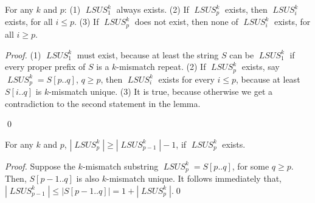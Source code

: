 \documentclass[11pt]{llncs}
\newcommand{\remove}[1]{}
\DeclareMathOperator{\lsus}{\mathit{LSUS}}
\begin{document}
\begin{lemma}
\label{lem:exist}
For any $k$ and $p$: (1) $\lsus_1^k$ always exists. (2) If
$\lsus_p^k$ exists, then $\lsus_i^k$ exists, for all $i\leq p$.
 (3) If $\lsus_p^k$ does not exist, then none of $\lsus^k_{i}$ exists,
for all  $i\geq p$.
\end{lemma}

\begin{proof}
(1) $\lsus_1^k$ must exist, because at least the string $S$ can be
$\lsus_1^k$ if every proper prefix of $S$ is a $k$-mismatch repeat. 
(2) If $\lsus_p^k$ exists, say $\lsus_p^k = S[p .. q]$, $q\geq p$,
then 
$\lsus_i^k$ exists for every $i\leq p$, because at least $S[i .. q]$ is
$k$-mismatch unique.
(3) It is true, because otherwise we get a contradiction to the second
statement in the lemma. 
\remove{
If $\lsus_p^k$ does not exist, it means $S[p .. n]$ is a
$k$-mismatch repeat. It follows that
every suffix $S[i.. n]$ of $S[p .. n]$, $i\geq p$, is
also a $k$-mismatch repeat, i.e., none of 
$\lsus_i^k$ exists, for all $i\geq p$.}
\qed
\end{proof}


\begin{lemma}
\label{lem:lsus2}
For any $k$ and $p$, $|\lsus_p^k| \geq |\lsus_{p-1}^k| - 1$, if
$\lsus_p^k$ exists. 
\end{lemma}


\begin{proof}
\remove{
  Since $\lsus_p^k$ exists, so does $\lsus_{p-1}^k$
  (Lemma~\ref{lem:exist}).  
}
  Suppose the $k$-mismatch substring 
  $\lsus_p^k = S[p..q]$, for some $q\geq p$. Then, 
  $S[p-1..q]$ is also $k$-mismatch unique. It follows immediately that, 
  $|\lsus_{p-1}^k| \leq |S[p-1..q]| = 1+|\lsus_p^k|$.\qed
\remove{
First, the lemma is trivially correct if
  $|\lsus_{p-1}^k| \leq 2$, because $|\lsus_p^k|\geq 1$.  Next, we
  prove the lemma for the case where
  $|\lsus_{p-1}^k| \geq 3$, using contradiction.  Let's say
  $\lsus_{p-1}^k = S[p-1 .. r]$, $r>p$.  Suppose $|\lsus_{p}^k| <
  |\lsus_{p-1}^k|-1$, it means $\lsus_p^k = S[p .. q]$ for some $q$,
  $p\leq
  q<r$. Because $S[p .. q]$ is $k$-mismatch unique, so is $S[p-1
  ..
  q]$. Now we get a $k$-mismatch unique
  substring $S[p-1..q]$, which is shorter than $S[p-1..r]$. However,
  we know $S[p-1..r] = \lsus_{p-1}^k$, the shortest $k$-mismatch
  unique substring starting at position $p-1$, raising a
  contradiction. }
\end{proof}

\remove{
By Lemma~\ref{lem:exist}, we know that given the string $S$ and the
integer $k$, there exists a unique integer $z$, $1\leq z\leq n$, such
that $\lsus_i^k$ exists for all $i\leq z$, and none of $\lsus_j^k$
exists for all $j > z$ (if $z<n$). Further, by Lemma~\ref{lem:lsus2},
we can observe that, of those existing
$\lsus_i^k$, $i\leq z$, their
start positions strictly increase and their ending positions
monotonically increase.
}
\end{document}
